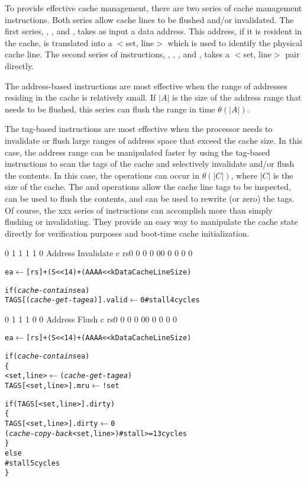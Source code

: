 To provide effective cache management, there are two series of cache management instructions.
Both series allow cache lines to be flushed and/or invalidated.
The first series, , , and , takes as input a data address.
This address, if it is resident in the cache, is translated into a $<$set, line$>$ which is used to
identify the physical cache line.
The second series of instructions, , , , and , takes
a $<$set, line$>$ pair directly.

The address-based instructions are most effective when the range of addresses residing in the cache is relatively
small. If $|A|$ is the size of the address range that needs to be flushed, this series can flush
the range in time $\theta(|A|)$.

The tag-based instructions are most effective when the processor needs to invalidate or flush
large ranges of address space that exceed the cache size. In this case, the address range can
be manipulated faster by using the tag-based instructions to
scan the tags of the cache and selectively invalidate and/or flush the contents.  In this case, the operations
can occur in $\theta(|C|)$, where $|C|$ is the size of the cache. The  and 
operations allow the cache line tags to be inspected,  can be used to flush the contents,
and  can be used to rewrite (or zero) the tags. Of course, the xxx series
of instructions can accomplish more than simply flushing or invalidating. They provide an easy
way to manipulate the cache state directly for verification purposes and boot-time cache initialization.



\vspace{5mm}
\codestretch
{}     {0 1 1 1 1 0} {Address Invalidate} {c} {\RawTag} {rs}{0 0 0 0 0}{0 0 0 0 0}
\begin{alltt}
         ea \(\leftarrow\) [rs] + (S << 14) + (AAAA << kDataCacheLineSize)

         if ({\em{cache-contains}} ea)
            TAGS[({\em{cache-get-tag}} ea)].valid \(\leftarrow\) 0    \# stall 4 cycles
            
\end{alltt}\rawInstrEnd

     {0 1 1 1 0 0} {Address Flush} {c} {\RawTag} {rs}{0 0 0 0 0}{0 0 0 0 0}
\begin{alltt}
         ea \(\leftarrow\) [rs] + (S << 14) + (AAAA << kDataCacheLineSize)

         if ({\em{cache-contains}} ea)
         \{
           <set,line> \(\leftarrow\) ({\em{cache-get-tag} ea})
           TAGS[<set,line>].mru \(\leftarrow\) !set   

           if (TAGS[<set,line>].dirty) 
           \{
              TAGS[<set,line>].dirty \(\leftarrow\) 0
              ({\em{cache-copy-back}} <set,line>)    \# stall >= 13 cycles
           \}
           else
              \# stall 5 cycles
         \}
\end{alltt}\rawInstrEnd

